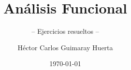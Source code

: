 \documentclass[graybox,envcountchap,sectrefs]{svmono}
\date{\today}
\begin{document}
\author{Héctor Carlos Guimaray Huerta}
\title{Análisis Funcional}
\subtitle{-- Ejercicios resueltos --}
\maketitle

\frontmatter






\tableofcontents

\mainmatter



\backmatter

\printindex
\end{document}
